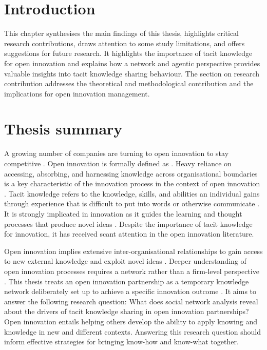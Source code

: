 
\section{Introduction}

This chapter synthesises the main findings of this thesis, highlights critical research contributions, draws attention to  some study limitations, and offers suggestions for future research. It highlights the importance of tacit knowledge for open innovation and explains how a network and agentic perspective provides valuable insights into tacit knowledge sharing behaviour. The section on research contribution addresses the theoretical and methodological contribution and the implications for open innovation management. 

\section{Thesis summary}

A growing number of companies are turning to open innovation to stay competitive \citep{stanko2017under}. Open innovation is formally defined as  \citep[][pg.~17]{chesbrough2014explicating}. Heavy reliance on accessing, absorbing, and harnessing knowledge across organisational boundaries is a key characteristic of the innovation process in the context of open innovation \citep{chesbrough2012open}. Tacit knowledge refers to the knowledge, skills, and abilities an individual gains through experience that is difficult to put into words or otherwise communicate \citep{kreutz2014catalyzing}. It is strongly implicated in innovation as it guides the learning and thought processes that produce novel ideas \citep{leonard1998role,lam2000tacit}. Despite the importance of tacit knowledge for innovation, it has received scant attention in the open innovation literature. \medskip

Open innovation implies extensive inter-organisational relationships to gain access to new external knowledge and exploit novel ideas \citep{chiaroni2011open}. Deeper understanding of open innovation processes requires a network rather than a firm-level perspective \citep{fichter2009innovation,martinez2014analysis,yun2016network}. This thesis treats an open innovation partnership as a temporary knowledge network deliberately set up to achieve a specific innovation outcome \citep{turner2003natureoftheproject,perez2013temporary,terhorst2018tacit}. It aims to answer the following research question: What does social network analysis reveal about the drivers of tacit knowledge sharing in open innovation partnerships? Open innovation entails helping others develop the ability to apply knowing and knowledge in new and different contexts. Answering this research question should inform effective strategies for bringing know-how and know-what together. \medskip

